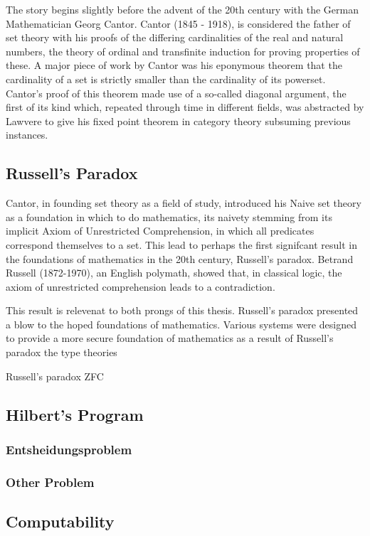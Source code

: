 The story begins slightly before the advent of the 20th century with the German
Mathematician Georg Cantor. Cantor (1845 - 1918), is considered the father of
set theory with his proofs of the differing cardinalities of the real and
natural numbers, the theory of ordinal and transfinite induction for proving
properties of these. A major piece of work by Cantor was his eponymous theorem
that the cardinality of a set is strictly smaller than the cardinality of its
powerset. Cantor's proof of this theorem made use of a so-called diagonal
argument, the first of its kind which, repeated through time in different
fields, was abstracted by Lawvere to give his fixed point theorem in category
theory subsuming previous instances.

\subsection{Russell's Paradox}
Cantor, in founding set theory as a field of study, introduced his Naive set
theory as a foundation in which to do mathematics, its naivety stemming from its
implicit Axiom of Unrestricted Comprehension, in which all predicates correspond
themselves to a set. This lead to perhaps the first signifcant result in the
foundations of mathematics in the 20th century, Russell's paradox. Betrand
Russell (1872-1970), an English polymath, showed that, in classical logic, the
axiom of unrestricted comprehension leads to a contradiction.


This result is relevenat to both prongs of this thesis. Russell's paradox
presented a blow to the hoped foundations of mathematics. Various systems were
designed to provide a more secure foundation of mathematics as a result of
Russell's paradox the type theories 

Russell's paradox
ZFC
\subsection{Hilbert's Program}
\subsubsection{Entsheidungsproblem}
\subsubsection{Other Problem}
\subsection{Computability}

